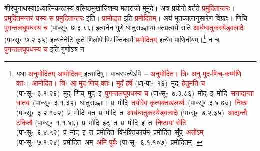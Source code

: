 \begin{sloppypar}\justifying\noindent\hspace{10mm} श्रीरघुनाथस्याऽध्यात्मिक\-रहस्यं वसिष्ठ\-मुखान्निशम्य महा\-राजो मुमुदे। अत्र प्रयोगो वर्तते \textcolor{red}{प्रमुदितान्तरः}। \textcolor{red}{प्रमुदितमन्तरं यस्य स प्रमुदितान्तरः} इति।
\textcolor{red}{प्रामोद्यत} इति \textcolor{red}{प्रमोदितम्}। अयं भूत\-कालानुसारेण विग्रहः। णिचि \textcolor{red}{पुगन्त\-लघूपधस्य च} (पा॰सू॰~७.३.८६) इत्यनेन गुणे धातुसञ्ज्ञायां क्त\-प्रत्यये सति \textcolor{red}{आर्धधातुकस्येड्वलादेः} (पा॰सू॰~७.२.३५) इत्यनेनेटि कृते णिलोपे विभक्ति\-कार्ये \textcolor{red}{प्रमोदितम्} इत्येव पाणिनीयम्।\footnote{यथा \textcolor{red}{अनुमोदितम् आमोदितम्} इत्यादिषु। वाचस्पत्येऽपि~– \textcolor{red}{अनुमोदित। त्रि॰ अनु मुद-णिच्-कर्म्मणि क्तः}। \textcolor{red}{आमोदित। त्रि॰ आ मुद-णिच्-क्तः}। \textcolor{red}{मुदँ हर्षे} (धा॰पा॰~१६)~\arrow मुद्~\arrow \textcolor{red}{हेतुमति च} (पा॰सू॰~३.१.२६)~\arrow मुद्~णिच्~\arrow मुद्~इ~\arrow \textcolor{red}{पुगन्त\-लघूपधस्य च} (पा॰सू॰~७.३.८६)~\arrow मोद्~इ~\arrow मोदि~\arrow \textcolor{red}{सनाद्यन्ता धातवः} (पा॰सू॰~३.१.३२)~\arrow धातु\-सञ्ज्ञा। प्र~मोदि~\arrow \textcolor{red}{तयोरेव कृत्य\-क्तखलर्थाः} (पा॰सू॰~३.४.७०)~\arrow \textcolor{red}{निष्ठा} (पा॰सू॰~३.२.१०२)~\arrow प्र~मोदि~क्त~\arrow प्र~मोदि~त~\arrow \textcolor{red}{आर्धधातुकस्येड्वलादेः} (पा॰सू॰~७.२.३५)~\arrow \textcolor{red}{आद्यन्तौ टकितौ} (पा॰सू॰~१.१.४६)~\arrow प्र~मोदि~इट्~त~\arrow प्र~मोदि~इ~त~\arrow \textcolor{red}{निष्ठायां सेटि} (पा॰सू॰~६.४.५२)~\arrow प्र~मोद्~इ~त~\arrow प्रमोदित~\arrow विभक्तिकार्यम्~\arrow प्रमोदित~सुँप्~\arrow \textcolor{red}{अतोऽम्} (पा॰सू॰~७.१.२४)~\arrow प्रमोदित~अम्~\arrow \textcolor{red}{अमि पूर्वः} (पा॰सू॰~६.१.१०७)~\arrow प्रमोदितम्।}
न च \textcolor{red}{पुगन्तलघूपधस्य च} इति गुणोऽत्र न

\end{sloppypar}
